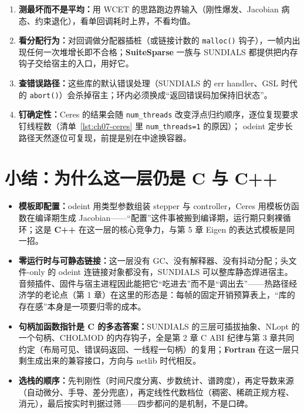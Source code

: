 \documentclass[12pt,a4paper,fontset=fandol]{ctexbook}
\newcommand{\Fn}[1]{\texttt{#1()}}
\newcommand{\Tp}[1]{\texttt{#1}}
\newcommand{\Lib}[1]{\textbf{#1}}
\newcommand{\Lang}[1]{\textsf{\bfseries #1}}
\newcommand{\CL}{\Lang{C}}
\newcommand{\CPP}{\Lang{C++}}
\newcommand{\FTN}{\Lang{Fortran}}
\begin{document}
\begin{bestpractice}[title={进环前的四项体检}]
\begin{enumerate}
\item \textbf{测最坏而不是平均：}用 WCET 的思路跑边界输入（刚性爆发、Jacobian 病态、约束退化），看单回调耗时上界，不看均值。
\item \textbf{看分配行为：}对回调做分配器插桩（或链接计数的 \Fn{malloc} 钩子），一帧内出现任何一次堆增长即不合格；\Lib{SuiteSparse} 一族与 SUNDIALS 都提供把内存钩子交给宿主的入口，用好它。
\item \textbf{查错误路径：}这些库的默认错误处理（SUNDIALS 的 err handler、GSL 时代的 \Fn{abort}）会杀掉宿主；环内必须换成``返回错误码加保持旧状态''。
\item \textbf{钉确定性：}Ceres 的结果会随 \Tp{num\_threads} 改变浮点归约顺序，逐位复现要求钉线程数（清单~\ref{lst:ch07-ceres} 里 \Tp{num\_threads=1} 的原因）； odeint 定步长路径天然逐位可复现，前提是别在中途换容器。
\end{enumerate}
\end{bestpractice}

\section{小结：为什么这一层仍是 \CL{} 与 \CPP{}}\label{sec:ch07-close}

\begin{guideline}[title={本章要点}]
\begin{itemize}
\item \textbf{模板即配置：}odeint 用类型参数组装 stepper 与 controller，Ceres 用模板仿函数在编译期生成 Jacobian——``配置''这件事被搬到编译期，运行期只剩裸循环；这是 \CPP{} 在这一层的核心竞争力，与第 5 章 Eigen 的表达式模板是同一招。
\item \textbf{零运行时与可静态链接：}这一层没有 GC、没有解释器、没有抖动分配；头文件-only 的 odeint 连链接对象都没有，SUNDIALS 可以整库静态焊进宿主。音频插件、固件与宿主进程因此能把它``吃进去''而不是``调出去''——热路径经济学的老论点（第 1 章）在这里的形态是：每帧的固定开销预算表上，``库的存在感''本身是一项要归零的成本。
\item \textbf{句柄加函数指针是 \CL{} 的多态答案：}SUNDIALS 的三层可插拔抽象、NLopt 的一个句柄、CHOLMOD 的内存钩子，全是第 2 章 C ABI 纪律与第 3 章共同约定（布局可见、错误码返回、一线程一句柄）的复用；\FTN{} 在这一层只剩生成出来的兼容接口，方向与 netlib 时代相反。
\item \textbf{选栈的顺序：}先判刚性（时间尺度分离、步数统计、谱跨度），再定导数来源（自动微分、手导、差分兜底），再定线性代数档位（稠密、稀疏正规方程、消元），最后按实时判据过筛——四步都问的是机制，不是口碑。
\end{itemize}
\end{guideline}
\end{document}
